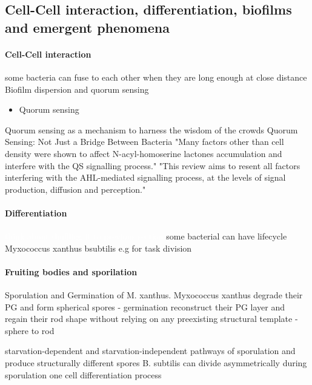\documentclass{article}
\newcommand{\todo}[1]{\colorbox{WildStrawberry}{\textcolor{white}{#1}}}
\begin{document}
\subsection{Cell-Cell interaction, differentiation, biofilms and emergent phenomena} %

\paragraph{Cell-Cell interaction}

some bacteria can fuse to each other when they are long enough at close distance \cite{Kudryashev2011}
Biofilm dispersion and quorum sensing \cite{Solano2014}

\begin{itemize}
    \item Quorum sensing
\end{itemize}
\cite{MorenoGmez2023} Quorum sensing as a mechanism to harness the wisdom of the crowds
\cite{Liu2025} Quorum Sensing: Not Just a Bridge Between Bacteria
\cite{Boyer2009} "Many factors other than cell density were shown to affect N-acyl-homoserine lactones accumulation and interfere with the QS signalling process." "This review aims to resent all factors interfering with the AHL-mediated signalling process, at the levels of signal production, diffusion and perception."

\paragraph{Differentiation} \todo{think about shuffling it to previous section} 
\cite{Jose2016} some bacterial can have lifecycle Myxococcus xanthus \cite{Branda2001} \ac{bsubtilis}
e.g for task division
\paragraph{Fruiting bodies and sporilation}
\cite{Huan2021} Sporulation and Germination of M. xanthus. Myxococcus xanthus degrade their PG and form spherical spores - germination reconstruct their PG layer and regain their rod shape without relying on any preexisting structural template - sphere to rod 

starvation-dependent and starvation-independent pathways of sporulation and produce structurally different spores \cite{Licking2000} B. subtilis can divide asymmetrically during sporulation one cell differentiation process \cite{Barák2019}
\end{document}

